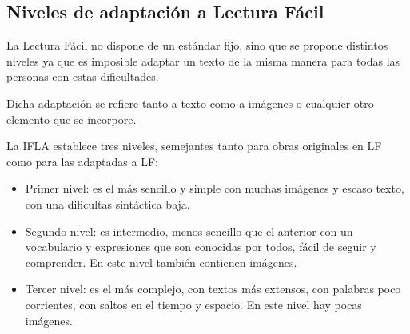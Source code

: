 

\subsection{Niveles de adaptación a Lectura Fácil}
La Lectura Fácil no dispone de un estándar fijo, sino que se propone distintos niveles ya que es imposible adaptar un texto de la misma manera para todas las personas con estas dificultades.

Dicha adaptación se refiere tanto a texto como a imágenes o cualquier otro elemento que se incorpore.

La IFLA establece tres niveles, semejantes
tanto para obras originales en LF como para las adaptadas a LF:
\begin{itemize}
	\item Primer nivel: es el más sencillo y simple con muchas imágenes y escaso texto, con una dificultas sintáctica baja.
	\item Segundo nivel: es intermedio, menos sencillo que el anterior con un vocabulario y expresiones que son conocidas por todos, fácil de seguir y comprender. En este nivel también contienen imágenes.
	\item Tercer nivel: es el más complejo, con textos más extensos, con palabras poco corrientes, con saltos en el tiempo y espacio. En este nivel hay pocas imágenes.
\end{itemize}

